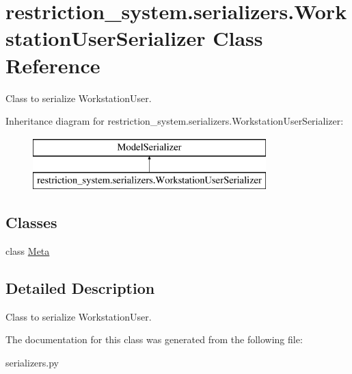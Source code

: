 \hypertarget{classrestriction__system_1_1serializers_1_1WorkstationUserSerializer}{}\section{restriction\+\_\+system.\+serializers.\+Workstation\+User\+Serializer Class Reference}
\label{classrestriction__system_1_1serializers_1_1WorkstationUserSerializer}


Class to serialize Workstation\+User.  


Inheritance diagram for restriction\+\_\+system.\+serializers.\+Workstation\+User\+Serializer\+:\begin{figure}[H]
\begin{center}
\leavevmode
\includegraphics[height=2.000000cm]{classrestriction__system_1_1serializers_1_1WorkstationUserSerializer}
\end{center}
\end{figure}
\subsection*{Classes}
\begin{DoxyCompactItemize}
\item 
class \hyperlink{classrestriction__system_1_1serializers_1_1WorkstationUserSerializer_1_1Meta}{Meta}
\end{DoxyCompactItemize}


\subsection{Detailed Description}
Class to serialize Workstation\+User. 

The documentation for this class was generated from the following file\+:\begin{DoxyCompactItemize}
\item 
serializers.\+py\end{DoxyCompactItemize}

